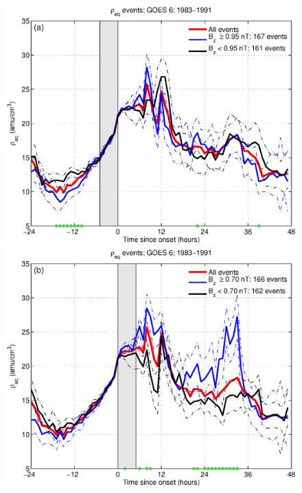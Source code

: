 \documentclass[12pt]{article}
\begin{document}
	\clearpage
	\begin{figure}[tp!]
		\centering
		\includegraphics[scale=0.40]{2016SW001507R-p08a.eps}
		\includegraphics[scale=0.40]{2016SW001507R-p08b.eps}
	\end{figure}
	
\end{document}
